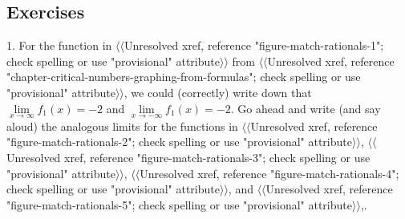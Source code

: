 \documentclass[12pt,]{book}
\theoremstyle{plain}
\theoremstyle{definition}
\theoremstyle{definition}
\theoremstyle{definition}
\theoremstyle{definition}
\theoremstyle{definition}
\numberwithin{equation}{section}
\newcommand{\fe}[2]{#1\mathopen{}\left(#2\right)\mathclose{}}
\begin{document}
\subsection[{Exercises}]{Exercises}\label{exercises-8}
\begin{exerciselist}
\item[1.]\hypertarget{exercise-79}{}For the function in {$\langle\langle$Unresolved xref, reference "figure-match-rationals-1"; check spelling or use "provisional" attribute$\rangle\rangle$} from {$\langle\langle$Unresolved xref, reference "chapter-critical-numbers-graphing-from-formulas"; check spelling or use "provisional" attribute$\rangle\rangle$}, we could (correctly) write down that \(\lim\limits_{x\to\infty}\fe{f_1}{x}=-2\) and \(\lim\limits_{x\to-\infty}\fe{f_1}{x}=-2\).  Go ahead and write (and say aloud) the analogous limits for the functions in {$\langle\langle$Unresolved xref, reference "figure-match-rationals-2"; check spelling or use "provisional" attribute$\rangle\rangle$}, {$\langle\langle$Unresolved xref, reference "figure-match-rationals-3"; check spelling or use "provisional" attribute$\rangle\rangle$}, {$\langle\langle$Unresolved xref, reference "figure-match-rationals-4"; check spelling or use "provisional" attribute$\rangle\rangle$}, and {$\langle\langle$Unresolved xref, reference "figure-match-rationals-5"; check spelling or use "provisional" attribute$\rangle\rangle$},.%
\par\smallskip
\end{exerciselist}
\hypertarget{exercisegroup-19}{}\par\noindent %
\end{document}
